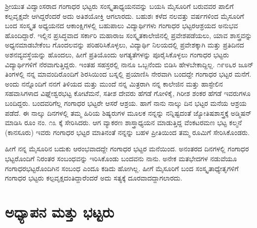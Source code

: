 {ಶ್ರೀಯುತ ವಿದ್ವಾಂಸರಾದ ಗಂಗಾಧರ ಭಟ್ಟರು ಸಂಸ್ಕೃತಾಧ್ಯಯನವನ್ನು ಬಯಸಿ ಮೈಸೂರಿಗೆ ಬರುವವರ ಪಾಲಿಗೆ ಕಲ್ಪವೃಕ್ಷವೇ ಆಗಿದ್ದರೆಂದರೆ ಅದು ಅತಿಶಯೋಕ್ತಿ ಆಗಲಾರದು. ಬಹುಶಃ ಕಳೆದ ನಲವತ್ತು ವರ್ಷಗಳಿಂದ ಮೈಸೂರಿಗೆ ಬಂದ ಸಂಸ್ಕೃತ \hbox{ಅಧ್ಯಯನದ} ಆಕಾಂಕ್ಷಿಗಳಲ್ಲಿ ಬಹುಪಾಲು ವಿದ್ಯಾರ್ಥಿಗಳು ಗಂಗಾಧರ ಭಟ್ಟರ\break ಆಶ್ರಯದ ಅನುಭವ ಹೊಂದಿದ್ದಾರೆ. ಇಲ್ಲಿನ ಪ್ರಸಿದ್ಧವಾದ ಸರ್ಕಾರಿ ಮಹಾರಾಜ ಸಂಸ್ಕೃತ\-ಕಾಲೇಜಿನಲ್ಲಿ ಪ್ರವೇಶಪಡೆಯಲು, ಯಾವ ಶಾಸ್ತ್ರವನ್ನು ಅಧ್ಯನಮಾಡ\-ಬೇಕೆಂಬ ಗೊಂದಲ\-ವನ್ನು ಪರಿಹರಿಸಿಕೊಳ್ಳಲು, ವಿದ್ಯಾರ್ಥಿ ನಿಲಯದಲ್ಲಿ ಪ್ರವೇಶಕ್ಕಾಗಿ ಮತ್ತು ಪ್ರತಿದಿನದ ಅಶನವ್ಯವಸ್ಥೆಯನ್ನು ಹೊಂದಲು, ಹೀಗೆ ಪ್ರತಿಯೊಂದು ಅಗತ್ಯತೆಗಳನ್ನು ಪೂರೈಸಿಕೊಳ್ಳಲು ಗಂಗಾಧರ ಭಟ್ಟರು ವಿದ್ಯಾರ್ಥಿಗಳಿಗೆ ನೆರವಾಗುತ್ತಿದ್ದರು. ಇಂತಹ ಸಹಸ್ರರಲ್ಲಿ ನಾನೂ ಒಬ್ಬನೆಂದು ಬಿಡಿಸಿ ಹೇಳಬೇಕಾದ್ದಿಲ್ಲ. ೧೯೮೬ರ ಜೂನ್ ತಿಂಗಳಲ್ಲಿ ನನ್ನ \hbox{ಮಾವಂದಿರೊಂದಿಗೆ} ಶಿರಸಿಯಿಂದ ಬಸ್ನಲ್ಲಿ ಪ್ರಯಾಣಿಸಿ ನೇರವಾಗಿ ಬಂದದ್ದೇ \hbox{ಗಂಗಾಧರ} ಭಟ್ಟರ ಮನೆಗೆ. ಅಂದು ನನ್ನೊಂದಿಗೆ ನನಗೆ ತಿಳಿಯದ ಮತ್ತು ಮುಂದೆ ನನ್ನ ಮಿತ್ರರಾಗಿ ನನ್ನ ಕಾಲೇಜಿನ ಮತ್ತು ಹಾಸ್ಟೇಲಿನ ಸಹವಾಸಿಗಳಾದ ವಿಘ್ನೇಶ್ವರಭಟ್ಟ ಕೋಟೆಮನೆ, ಸತೀಶ ದೇವರು ಹೆಗಡೆ ಗೋಳಿಕೈ, ಗಿರೀಶ ಶಂಕರ ಹೆಗಡೆ ಇವರುಗಳೂ \hbox{ಬಂದಿದ್ದರು.} ಬಂದವರಿಗೆಲ್ಲ ಗಂಗಾಧರ ಭಟ್ಟರೇ ಆಸರೆ  \enginline{-}  ಆಶ್ರಯ. ಹಾಗೆ ನಾನು ನಾಲ್ಕು ದಿನ ಭಟ್ಟರ ಮನೆಯ ಆಶ್ರಯ ಪಡೆದೆ. ಈ ನಾಲ್ಕು ದಿನಗಳಲ್ಲಿ ತಮ್ಮ ಹಿರಿಯ ಶಿಷ್ಯರುಗಳ ಮೂಲಕ ನನ್ನನ್ನು ನನ್ನಿಷ್ಟದಂತೆ ಜ್ಯೋತಿಷಶಾಸ್ತ್ರಕ್ಕೆ ಅಡ್ಮಿಷನ್ ಮಾಡಿಸಿ ರೂಂ ನಂ. ೧೩ ಕ್ಕೆ ಸೇರಿಸಿದರು. ಆಗ ವ್ಯಾಕರಣ ಶಾಸ್ತ್ರಾಧ್ಯಯನ ಮಾಡುತ್ತಿದ್ದ ವೆಂಕಟರಮಣ ಭಟ್ಟ ಕಲ್ಮನೆ (ಕಾನಸೂರು) ಇವರು ಗಂಗಾಧರ ಭಟ್ಟರ ಮಾತಿನಂತೆ ನನ್ನನ್ನು ಬಹಳ ಪ್ರೀತಿಯಿಂದ ತಮ್ಮ ರೂಮಿಗೆ ಸೇರಿಸಿಕೊಂಡರು. 

ಹೀಗೆ ನನ್ನ ಮೈಸೂರಿನ ಬದುಕು ಆರಂಭವಾದದ್ದೇ ಗಂಗಾಧರ ಭಟ್ಟರ ಮನೆಯಿಂದ. ಅನಂತರದ ದಿನಗಳಲ್ಲಿ ಗಂಗಾಧರ ಭಟ್ಟರೊಂದಿಗೆ ನಿರಂತರ ಸಂಬಂಧವನ್ನು ಇರಿಸಿಕೊಂಡು ಬಂದವನು ನಾನು. ಅನೇಕ ಮತಭೇದಗಳ ನಡುವೆಯೂ ಗಂಗಾಧರ\-ಭಟ್ಟರೊಂದಿಗಿನ ಸಂಬಂಧ ಎಂದೂ ಕಡಿದು ಹೋಗಿಲ್ಲ. ಹೀಗೆ ಮೈಸೂರಿಗೆ ಬಂದ ಸಂಸ್ಕೃತಾ\-ಧ್ಯೇತೃಗಳಿಗೆ ಗಂಗಾಧರ ಭಟ್ಟರು ಕಲ್ಪವೃಕ್ಷದಂತಿದ್ದಾರೆಂದರೆ ಅದು ಸತ್ಯಕ್ಕೆ ದೂರವಾದದ್ದಾಗಲಾರದು.

\section*{ಅಧ್ಯಾಪನ ಮತ್ತು ಭಟ್ಟರು}

}
